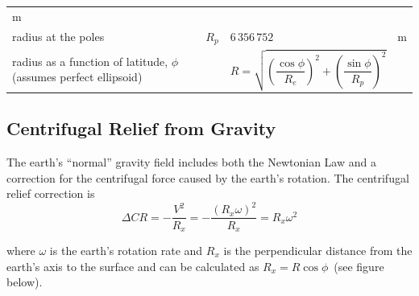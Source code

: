 \documentclass[
]{book}
\begin{document}
\begin{longtable}[]{@{}llll@{}}
\begin{minipage}[t]{0.05\columnwidth}
m\strut
\end{minipage}\tabularnewline
\begin{minipage}[t]{0.34\columnwidth}\raggedright
radius at the poles\strut
\end{minipage} & \begin{minipage}[t]{0.06\columnwidth}\raggedright
\(R_p\)\strut
\end{minipage} & \begin{minipage}[t]{0.44\columnwidth}\raggedright
\(6\,356\,752\)\strut
\end{minipage} & \begin{minipage}[t]{0.05\columnwidth}\raggedright
m\strut
\end{minipage}\tabularnewline
\begin{minipage}[t]{0.34\columnwidth}\raggedright
radius as a function of latitude, \(\phi\) (assumes perfect ellipsoid)\strut
\end{minipage} & \begin{minipage}[t]{0.06\columnwidth}\raggedright
\strut
\end{minipage} & \begin{minipage}[t]{0.44\columnwidth}\raggedright
\[R = \sqrt{\left(\frac{\cos{\phi}}{R_e}\right)^2 + \left(\frac{\sin{\phi}}{R_p}\right)^2} \]\strut
\end{minipage} & \begin{minipage}[t]{0.05\columnwidth}\raggedright
\strut
\end{minipage}\tabularnewline
\bottomrule
\end{longtable}

\hypertarget{centrifugal-relief-from-gravity}{%
\subsection*{Centrifugal Relief from Gravity}\label{centrifugal-relief-from-gravity}}

The earth's ``normal'' gravity field includes both the Newtonian Law and a correction for the centrifugal force caused by the earth's rotation. The centrifugal relief correction is
\[
\Delta C R = -\frac{V^2}{R_x} = -\frac{\left( R_x \omega \right)^2}{R_x} = R_x \omega^2
\]

where \(\omega\) is the earth's rotation rate and \(R_x\) is the perpendicular distance from the earth's axis to the surface and can be calculated as \(R_x =R \cos{\phi}\)~(see figure below).
\end{document}
